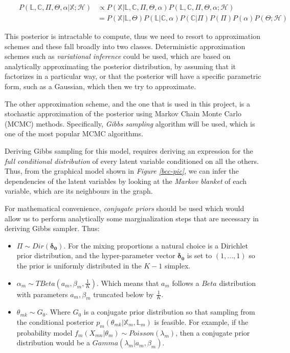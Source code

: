 \begin{equation}\scriptstyle
	\begin{aligned}
	& & \scriptstyle P(\mathbb{L},\mathbb{C},\Pi ,\Theta , \alpha | \mathbb{X}; \mathcal{H}) & \scriptstyle \propto P(\mathbb{X}|\mathbb{L}, \mathbb{C},\Pi ,\Theta , \alpha) P(\mathbb{L}, \mathbb{C}, \Pi , \Theta , \alpha; \mathcal{H}) \\
	& & & \scriptstyle = P(\mathbb{X}|\mathbb{L},\Theta) P(\mathbb{L}|\mathbb{C},\alpha) P(\mathbb{C}|\Pi) P(\Pi) P(\alpha) P(\Theta ; \mathcal{H})
	\end{aligned}
\end{equation}

This posterior is intractable to compute, thus we need to resort to approximation schemes and these fall broadly into two classes. Deterministic approximation schemes such as \emph{variational inference} could be used, which are based on analytically approximating the posterior distribution, by assuming that it factorizes in a particular way, or that the posterior will have a specific parametric form, such as a Gaussian, which then we try to approximate.

The other approximation scheme, and the one that is used in this project, is a stochastic approximation of the posterior using Markov Chain Monte Carlo (MCMC) methods. Specifically, \emph{Gibbs sampling} algorithm will be used, which is one of the most popular MCMC algorithms. 

Deriving Gibbs sampling for this model, requires deriving an expression for the \emph{full conditional distribution} of every latent variable conditioned on all the others. Thus, from the graphical model shown in \emph{Figure \ref{bcc-pic}}, we can infer the dependencies of the latent variables by looking at the \emph{Markov blanket} of each variable, which are its neighbours in the graph. 

For mathematical convenience, \emph{conjugate priors} should be used which would allow us to perform analytically some marginalization steps that are necessary in deriving Gibbs sampler. Thus:

\begin{itemize}
	\item $\Pi \sim Dir(\mathbf{\delta_{0}})$. For the mixing proportions a natural choice is a Dirichlet prior distribution, and the hyper-parameter vector $\mathbf{\delta_{0}}$ is set to $(1,...,1)$ so the prior is uniformly distributed in the $K-1$ simplex.
	\item $\alpha_{m} \sim TBeta(\mathit{a_{m}}, \beta_{m}, \frac{1}{K})$. Which means that $a_{m}$ follows a  $Beta$ distribution with parameters $\mathit{a_{m}}, \beta_{m}$ truncated below by $\frac{1}{K}$.
	\item $\theta_{mk} \sim G_{0}$. Where $G_{0}$ is a conjugate prior distribution so that sampling from the conditional posterior $p_{m}(\theta_{mk}|\mathbb{X}_{m}, \mathbb{L}_{m})$ is feasible. For example, if the probability model $f_{m}(X_{mn}|\theta_{m}) \sim Poisson(\lambda_{m})$, then a conjugate prior distribution would be a $Gamma(\lambda_{m}|\mathit{a_{m}}, \beta_{m})$.
\end{itemize}

